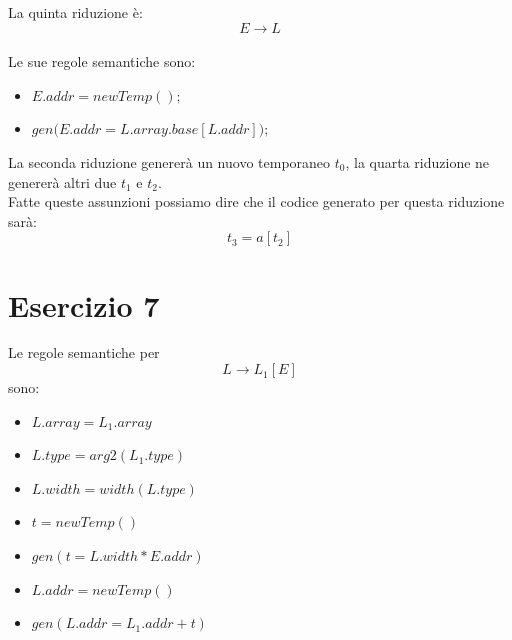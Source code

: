 \documentclass[11pt]{article}
\begin{document}
\begin{center}
\begin{minipage}[t]{\linewidth}
\begin{multicols}{2}
\begin{figure}[H]
      \end{figure}
      La quinta riduzione è: $$E \rightarrow L$$
      \\Le sue regole semantiche sono: 
      \begin{itemize}
        \item $E.addr = newTemp();$
        \item $gen\big(E.addr = L.array.base[L.addr]\big);$
      \end{itemize}
      La seconda riduzione genererà un nuovo temporaneo $t_0$, 
      la quarta riduzione ne genererà altri due $t_1$ e $t_2$.
      \\Fatte queste assunzioni possiamo dire che il codice generato
      per questa riduzione sarà: $$t_3 = a[t_2]$$
    \end{multicols}
  \end{minipage}
\end{center}
\section*{Esercizio 7}
Le regole semantiche per $$L \rightarrow L_1[E]$$ sono:
\begin{itemize}
  \item $L.array = L_1.array$
  \item $L.type = arg2(L_1.type)$
  \item $L.width = width(L.type)$
  \item $t = newTemp()$
  \item $gen(t = L.width * E.addr)$
  \item $L.addr = newTemp()$
  \item $gen(L.addr = L_1.addr + t)$
\end{itemize}
\newpage
\end{document}
